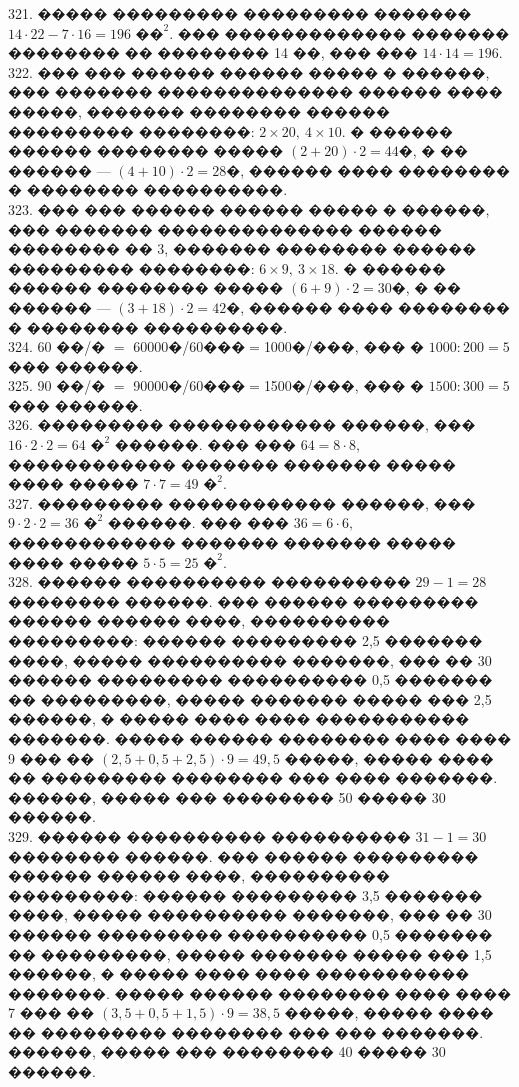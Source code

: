 \documentclass[12pt]{article}
\begin{document}
321. ����� ��������� ��������� ������� $14\cdot22-7\cdot16=196\text{ ��}^2.$ ��� ������������� ������� �������� �� �������� 14 ��, ��� ��� $14\cdot 14=196.$\\
322. ��� ��� ������ ������ ����� � ������, ��� ������� �������������� ������ ���� �����, ������� �������� ������ ��������� ��������: $2\times20,\ 4\times10.$  � ������ ������ �������� ����� $(2+20)\cdot2=44$�, � �� ������ --- $(4+10)\cdot2=28$�, ������ ���� �������� � �������� ����������.\\
323. ��� ��� ������ ������ ����� � ������, ��� ������� �������������� ������ �������� �� 3, ������� �������� ������ ��������� ��������: $6\times9,\ 3\times18.$ � ������ ������ �������� ����� $(6+9)\cdot2=30$�, � �� ������ --- $(3+18)\cdot2=42$�, ������ ���� �������� � �������� ����������.\\
324. 60 ��/� $=$ 60000�/60���$=$1000�/���, ��� � $1000:200=5$ ��� ������.\\
325. 90 ��/� $=$ 90000�/60���$=$1500�/���, ��� � $1500:300=5$ ��� ������.\\
326. ��������� ������������ ������, ��� $16\cdot2\cdot2=64\text{ �}^2$ ������. ��� ��� $64=8\cdot8,$ ������������ ������� ������� ����� ���� ����� $7\cdot7=49\text{ �}^2.$\\
327. ��������� ������������ ������, ��� $9\cdot2\cdot2=36\text{ �}^2$ ������. ��� ��� $36=6\cdot6,$ ������������ ������� ������� ����� ���� ����� $5\cdot5=25\text{ �}^2.$\\
328. ������ ���������� ���������� $29-1=28$ ��������  ������. ��� ������ ��������� ������ ������ ����, ���������� ���������: ������ ��������� 2,5 ������� ����, ����� ���������� �������, ��� �� 30 ������ ��������� ���������� 0,5 ������� �� ���������, ����� ������� ����� ��� 2,5 ������, � ����� ���� ���� ����������� �������. ����� ������ �������� ���� ���� 9 ��� �� $(2,5+0,5+2,5)\cdot9=49,5$ �����, ����� ���� �� ��������� �������� ��� ���� �������. ������, ����� ��� �������� 50 ����� 30 ������.\\
329. ������ ���������� ���������� $31-1=30$ ��������  ������. ��� ������ ��������� ������ ������ ����, ���������� ���������: ������ ��������� 3,5 ������� ����, ����� ���������� �������, ��� �� 30 ������ ��������� ���������� 0,5 ������� �� ���������, ����� ������� ����� ��� 1,5 ������, � ����� ���� ���� ����������� �������. ����� ������ �������� ���� ���� 7 ��� �� $(3,5+0,5+1,5)\cdot9=38,5$ �����, ����� ���� �� ��������� �������� ��� ��� �������. ������, ����� ��� �������� 40 ����� 30 ������.\\
\end{document}

